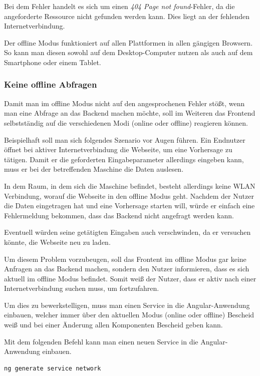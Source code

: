 Bei dem Fehler handelt es sich um einen \textit{404 Page not found}-Fehler, da die angeforderte Ressource nicht gefunden
werden kann. Dies liegt an der fehlenden Internetverbindung.

Der offline Modus funktioniert auf allen Plattformen in allen gängigen Browsern. So kann man diesen sowohl auf dem
Desktop-Computer nutzen als auch auf dem Smartphone oder einem Tablet.

\subsubsection{Keine offline Abfragen}
Damit man im offline Modus nicht auf den angesprochenen Fehler stößt, wenn man eine Abfrage an das Backend machen
möchte, soll im Weiteren das Frontend selbstständig auf die verschiedenen Modi (online oder offline) reagieren können.

Beispielhaft soll man sich folgendes Szenario vor Augen führen. Ein Endnutzer öffnet bei aktiver Internetverbindung die
Webseite, um eine Vorhersage zu tätigen. Damit er die geforderten Eingabeparameter allerdings eingeben kann, muss er bei
der betreffenden Maschine die Daten auslesen.

In dem Raum, in dem sich die Maschine befindet, besteht allerdings keine WLAN Verbindung, worauf die Webseite in den
offline Modus geht. Nachdem der Nutzer die Daten eingetragen hat und eine Vorhersage starten will, würde er einfach
eine Fehlermeldung bekommen, dass das Backend nicht angefragt werden kann.

Eventuell würden seine getätigten Eingaben auch verschwinden, da er versuchen könnte, die Webseite neu zu laden.

Um diesem Problem vorzubeugen, soll das Frontent im offline Modus gar keine Anfragen an das Backend machen, sondern den
Nutzer informieren, dass es sich aktuell im offline Modus befindet. Somit weiß der Nutzer, dass er aktiv nach einer
Internetverbindung suchen muss, um fortzufahren.

Um dies zu bewerkstelligen, muss man einen Service in die Angular-Anwendung einbauen, welcher immer über den aktuellen
Modus (online oder offline) Bescheid weiß und bei einer Änderung allen Komponenten Bescheid geben kann.

Mit dem folgenden Befehl kann man einen neuen Service in die Angular-Anwendung einbauen.

\begin{lstlisting}[caption=Hinzufügen eines Services, label=ls:umsetzung_angularaddservice]
    ng generate service network
\end{lstlisting}

